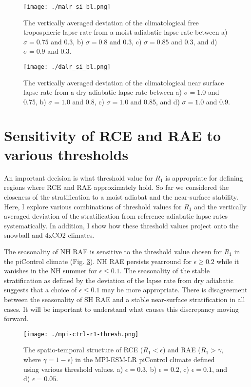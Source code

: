 \documentclass[11pt]{article}
\begin{document}
\begin{figure}[htbp]
\centering
\texttt{[image: ./malr\_si\_bl.png]}
\caption{\label{fig:orgf93e87d}The vertically averaged deviation of the climatological free tropospheric lapse rate from a moist adiabatic lapse rate between a) \(\sigma=0.75\) and 0.3, b) \(\sigma=0.8\) and 0.3, c) \(\sigma=0.85\) and 0.3, and d) \(\sigma=0.9\) and 0.3.}
\end{figure}

\begin{figure}[htbp]
\centering
\texttt{[image: ./dalr\_si\_bl.png]}
\caption{\label{fig:orge4b83ad}The vertically averaged deviation of the climatological near surface lapse rate from a dry adiabatic lapse rate between a) \(\sigma=1.0\) and 0.75, b) \(\sigma=1.0\) and 0.8, c) \(\sigma=1.0\) and 0.85, and d) \(\sigma=1.0\) and 0.9.}
\end{figure}

\section{Sensitivity of RCE and RAE to various thresholds}
\label{sec:org95ff62c}
An important decision is what threshold value for \(R_1\) is appropriate for defining regions where RCE and RAE approximately hold. So far we considered the closeness of the stratification to a moist adiabat and the near-surface stability. Here, I explore various combinations of threshold values for \(R_1\) and the vertically averaged deviation of the stratification from reference adiabatic lapse rates systematically. In addition, I show how these threshold values project onto the snowball and 4xCO2 climates.

The seasonality of NH RAE is sensitive to the threshold value chosen for \(R_1\) in the piControl climate (Fig. \ref{fig:org42cb587}). NH RAE persists yearround for \(\epsilon\ge0.2\) while it vanishes in the NH summer for \(\epsilon\le0.1\). The seasonality of the stable stratification as defined by the deviation of the lapse rate from dry adiabatic suggests that a choice of \(\epsilon\le0.1\) may be more appropriate. There is disagreement between the seasonality of SH RAE and a stable near-surface stratification in all cases. It will be important to understand what causes this discrepancy moving forward.

\begin{figure}[htbp]
\centering
\texttt{[image: ./mpi-ctrl-r1-thresh.png]}
\caption{\label{fig:org42cb587}The spatio-temporal structure of RCE (\(R_1<\epsilon\)) and RAE (\(R_1>\gamma\), where \(\gamma=1-\epsilon\)) in the MPI-ESM-LR piControl climate defined using various threshold values. a) \(\epsilon=0.3\), b) \(\epsilon=0.2\), c) \(\epsilon=0.1\), and d) \(\epsilon=0.05\).}
\end{figure}
\end{document}
